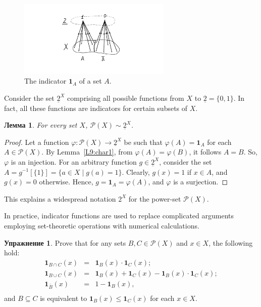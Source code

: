 \documentclass[12pt,notitlepage]{article}
\theoremstyle{plain}
\newtheorem{lemma}[thm]{Лемма}
\theoremstyle{definition}
\newtheorem{exc}[thm]{Упражнение}
\theoremstyle{plain}
\newcommand{\sbs}{\subseteq}
\newcommand{\mP}{\mathcal{P}}
\renewcommand{\phi}{\varphi}
\newcommand{\ul}[1]{\underline{#1}}
\newcommand{\1}{\mathbf{1}}
\newcommand{\0}{\mathbf{0}}
\newcommand{\mcomm}[1]{}
\begin{document}
\begin{figure}[h]
	\centering
	\includegraphics*[width=0.65\textwidth]{ind_func.pdf}
	\caption{The indicator $\1_A$ of a set $A$.}
\end{figure}

Consider the set $\ul{2}^X$ comprising all possible functions from $X$ to $\ul{2} = \{0, 1\}$. In fact, all these functions are indicators for certain subsets of $X$.
\begin{lemma}\label{L9:char2}
	For every set $X$, $\mP(X) \sim \ul{2}^X$.
\end{lemma}
\begin{proof} 
	Let a function $\phi\colon \mP(X) \to \ul{2}^X$ be such that $\phi(A) = \1_A$ for each $A \in \mP(X)$. By  Lemma~\ref{L9:char1}, from $\phi(A) = \phi(B)$, it follows $A = B$. So, $\phi$ is an injection. For an arbitrary function $g \in \ul{2}^X$, consider the set $A = g^{-1}[\{ 1 \}] = \{ a \in X \mid g(a) = 1 \}$. Clearly, $g(x) = 1$ if $x \in A$, and $g(x) = 0$ otherwise. Hence, $g = \1_A = \phi(A)$, and $\phi$ is a surjection.
\end{proof}
\noindent This explains a widespread notation $2^X$ for the power-set $\mP(X)$.

In practice, indicator functions are used to replace complicated arguments employing set-theoretic operations with numerical calculations.
\begin{exc}
	Prove that for any sets $B,C \in \mP(X)$ and $x \in X$, the following hold:
	$$
	\begin{array}{rcl}
		\1_{B \cap C}(x) &=& \1_B(x) \cdot \1_C(x);\\
		\1_{B \cup C}(x) &=& \1_B(x) + \1_C(x) - \1_B(x) \cdot \1_C(x);\\
		\1_{\bar B}(x) &=& 1 - \1_B(x),\\
	\end{array}$$
	and $B \sbs C$ is equivalent to $\1_B(x) \leq \1_C(x)$ for each $x \in X$.
\end{exc}

\mcomm{In practice, we omit indicators' argument for it typically does not change throughout such proofs.}
\end{document}
